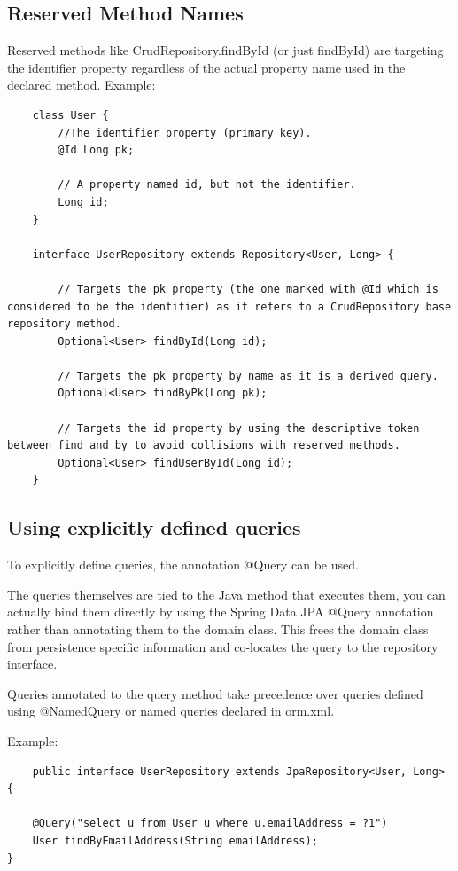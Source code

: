 \documentclass{scrartcl}
\begin{document}
\subsection{Reserved Method Names}

    Reserved methods like CrudRepository.findById (or just findById) are targeting the identifier property regardless of the actual property name used in the declared method.
    Example:

\begin{lstlisting}
    class User {
        //The identifier property (primary key).
        @Id Long pk;

        // A property named id, but not the identifier.
        Long id;
    }

    interface UserRepository extends Repository<User, Long> {

        // Targets the pk property (the one marked with @Id which is considered to be the identifier) as it refers to a CrudRepository base repository method.
        Optional<User> findById(Long id);

        // Targets the pk property by name as it is a derived query.
        Optional<User> findByPk(Long pk);

        // Targets the id property by using the descriptive token between find and by to avoid collisions with reserved methods.
        Optional<User> findUserById(Long id);
    }

\end{lstlisting}

\subsection{Using explicitly defined queries}

To explicitly define queries, the annotation @Query can be used.

The queries themselves are tied to the Java method that executes them, you can actually bind them directly by using the Spring Data JPA @Query annotation rather than annotating them to the domain class. This frees the domain class from persistence specific information and co-locates the query to the repository interface.

Queries annotated to the query method take precedence over queries defined using @NamedQuery or named queries declared in orm.xml.

Example:

\begin{lstlisting}
    public interface UserRepository extends JpaRepository<User, Long> {

    @Query("select u from User u where u.emailAddress = ?1")
    User findByEmailAddress(String emailAddress);
}

\end{lstlisting}
\end{document}
